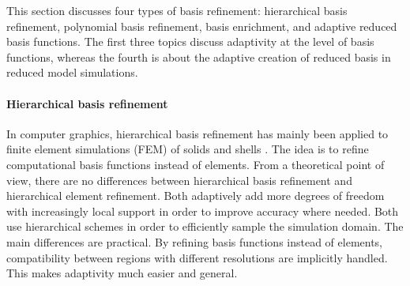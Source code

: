 This section discusses four types of basis refinement: hierarchical basis refinement, polynomial basis refinement, basis enrichment, and adaptive reduced basis functions.
The first three topics discuss adaptivity at the level of basis functions, whereas the fourth is about the adaptive creation of reduced basis in reduced model simulations.

\paragraph*{Hierarchical basis refinement}
In computer graphics, hierarchical basis refinement has mainly been applied to finite element simulations (FEM) of solids and shells \cite{Capell2002,Grinspun2002}. The idea is to refine computational basis functions instead of elements. From a theoretical point of view, there are no differences between hierarchical basis refinement and hierarchical element refinement. Both adaptively add more degrees of freedom with increasingly local support in order to improve accuracy where needed. Both use hierarchical schemes in order to efficiently sample the simulation domain.
The main differences are practical. By refining basis functions instead of elements, compatibility between regions with different resolutions are implicitly handled.
This makes adaptivity much easier and general.

